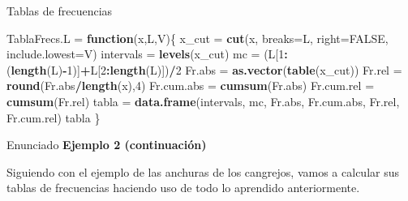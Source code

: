 \documentclass[
  ignorenonframetext,
  aspectratio=169]{beamer}
\newenvironment{Shaded}{\begin{snugshade}}{\end{snugshade}}
\newcommand{\AttributeTok}[1]{\textcolor[rgb]{0.13,0.29,0.53}{#1}}
\newcommand{\ConstantTok}[1]{\textcolor[rgb]{0.56,0.35,0.01}{#1}}
\newcommand{\ControlFlowTok}[1]{\textcolor[rgb]{0.13,0.29,0.53}{\textbf{#1}}}
\newcommand{\DecValTok}[1]{\textcolor[rgb]{0.00,0.00,0.81}{#1}}
\newcommand{\FunctionTok}[1]{\textcolor[rgb]{0.13,0.29,0.53}{\textbf{#1}}}
\newcommand{\NormalTok}[1]{#1}
\newcommand{\OtherTok}[1]{\textcolor[rgb]{0.56,0.35,0.01}{#1}}
\newcommand{\SpecialCharTok}[1]{\textcolor[rgb]{0.81,0.36,0.00}{\textbf{#1}}}
\begin{document}
\begin{frame}[fragile]{Tablas de frecuencias}
\label{tablas-de-frecuencias}
\begin{Shaded}
\begin{Highlighting}[]
\NormalTok{TablaFrecs.L }\OtherTok{=} \ControlFlowTok{function}\NormalTok{(x,L,V)\{}
\NormalTok{  x\_cut }\OtherTok{=} \FunctionTok{cut}\NormalTok{(x, }\AttributeTok{breaks=}\NormalTok{L, }\AttributeTok{right=}\ConstantTok{FALSE}\NormalTok{, }\AttributeTok{include.lowest=}\NormalTok{V)}
\NormalTok{  intervals }\OtherTok{=} \FunctionTok{levels}\NormalTok{(x\_cut)}
\NormalTok{  mc }\OtherTok{=}\NormalTok{ (L[}\DecValTok{1}\SpecialCharTok{:}\NormalTok{(}\FunctionTok{length}\NormalTok{(L)}\SpecialCharTok{{-}}\DecValTok{1}\NormalTok{)]}\SpecialCharTok{+}\NormalTok{L[}\DecValTok{2}\SpecialCharTok{:}\FunctionTok{length}\NormalTok{(L)])}\SpecialCharTok{/}\DecValTok{2}
\NormalTok{  Fr.abs }\OtherTok{=} \FunctionTok{as.vector}\NormalTok{(}\FunctionTok{table}\NormalTok{(x\_cut)) }
\NormalTok{  Fr.rel }\OtherTok{=} \FunctionTok{round}\NormalTok{(Fr.abs}\SpecialCharTok{/}\FunctionTok{length}\NormalTok{(x),}\DecValTok{4}\NormalTok{)}
\NormalTok{  Fr.cum.abs }\OtherTok{=} \FunctionTok{cumsum}\NormalTok{(Fr.abs)}
\NormalTok{  Fr.cum.rel }\OtherTok{=} \FunctionTok{cumsum}\NormalTok{(Fr.rel)}
\NormalTok{  tabla }\OtherTok{=} \FunctionTok{data.frame}\NormalTok{(intervals, mc, Fr.abs, Fr.cum.abs, Fr.rel, Fr.cum.rel)}
\NormalTok{  tabla}
\NormalTok{  \}}
\end{Highlighting}
\end{Shaded}
\end{frame}

\begin{frame}{Enunciado}
\label{enunciado}
\textbf{Ejemplo 2 (continuación)}

Siguiendo con el ejemplo de las anchuras de los cangrejos, vamos a
calcular sus tablas de frecuencias haciendo uso de todo lo aprendido
anteriormente.
\end{frame}
\end{document}
